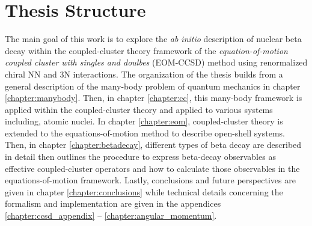 \documentclass[../thesis.tex]{subfiles}
\begin{document}
\section{Thesis Structure}

The main goal of this work is to explore the \emph{ab initio} description of nuclear beta decay within the coupled-cluster theory framework of the \textit{equation-of-motion coupled cluster with singles and doulbes} (EOM-CCSD) method using renormalized chiral NN and 3N interactions.  The organization of the thesis builds from a general description of the many-body problem of quantum mechanics in chapter \ref{chapter:manybody}. Then, in chapter \ref{chapter:cc}, this many-body framework is applied within the coupled-cluster theory and applied to various systems including, atomic nuclei. In chapter \ref{chapter:eom}, coupled-cluster theory is extended to the equations-of-motion method to describe open-shell systems.  Then, in chapter \ref{chapter:betadecay}, different types of beta decay are described in detail then outlines the procedure to express beta-decay observables as effective coupled-cluster operators and how to calculate those observables in the equations-of-motion framework.  Lastly, conclusions and future perspectives are given in chapter \ref{chapter:conclusions} while technical details concerning the formalism and implementation are given in the appendices \ref{chapter:ccsd_appendix} -- \ref{chapter:angular_momentum}.
\end{document}
